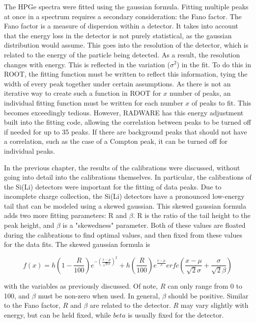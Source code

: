 The HPGe spectra were fitted using the gaussian formula. Fitting multiple peaks at once in a spectrum requires a secondary consideration: the Fano factor. The Fano factor is a measure of dispersion within a detector\citep{fano47:_factor}. It takes into account that the energy loss in the detector is not purely statistical, as the gaussian distribution would assume. This goes into the resolution of the detector, which is related to the energy of the particle being detected. As a result, the resolution changes with energy. This is reflected in the variation ($\sigma^2$) in the fit. To do this in ROOT, the fitting function must be written to reflect this information, tying the width of every peak together under certain assumptions. As there is not an iterative way to create such a function in ROOT for $x$ number of peaks, an individual fitting function must be written for each number $x$ of peaks to fit. This becomes exceedingly tedious. However, RADWARE has this energy adjustment built into the fitting code, allowing the correlation between peaks to be turned off if needed for up to 35 peaks. If there are background peaks that should not have a correlation, such as the case of a Compton peak, it can be turned off for individual peaks.

In the previous chapter, the results of the calibrations were discussed, without going into detail into the calibrations themselves. In particular, the calibrations of the Si(Li) detectors were important for the fitting of data peaks. Due to incomplete charge collection, the Si(Li) detectors have a pronounced low-energy tail that can be modeled using a skewed gaussian. This skewed gaussian formula adds two more fitting parameters: R and $\beta$. R is the ratio of the tail height to the peak height, and $\beta$ is a "skewedness" parameter. Both of these values are floated during the calibrations to find optimal values, and then fixed from these values for the data fits. The skewed gaussian formula is

\begin{equation}
    f(x) = h\left(1-\frac{R}{100}\right)e^{-\left(\frac{x-\mu}{\sqrt{2}\sigma}\right)^2} + h\left(\frac{R}{100}\right)e^{\frac{x-\mu}{\beta}}erfc\left(\frac{x-\mu}{\sqrt{2}\sigma}+\frac{\sigma}{\sqrt{2}\beta}\right)
    \label{eq:skew}
\end{equation}

with the variables as previously discussed. Of note, $R$ can only range from 0 to 100, and $\beta$ must be non-zero when used. In general, $\beta$ should be positive. Similar to the Fano factor, $R$ and $\beta$ are related to the detector. $R$ may vary slightly with energy, but can be held fixed, while $beta$ is usually fixed for the detector.

